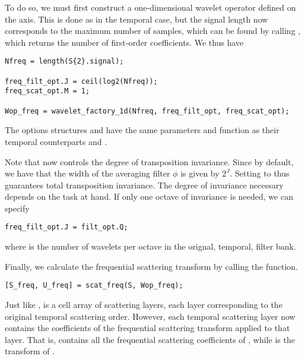 \documentclass{article}
\begin{document}
To do so, we must first construct a one-dimensional wavelet operator defined on the  axis. This is done as in the temporal case, but the signal length now corresponds to the maximum number of  samples, which can be found by calling , which returns the number of first-order coefficients. We thus have
\begin{lstlisting}
Nfreq = length(S{2}.signal);

freq_filt_opt.J = ceil(log2(Nfreq));
freq_scat_opt.M = 1;

Wop_freq = wavelet_factory_1d(Nfreq, freq_filt_opt, freq_scat_opt);
\end{lstlisting}
The options structures  and  have the same parameters and function as their temporal counterparts  and .

Note that  now controls the degree of transposition invariance. Since  by default, we have that the width of the averaging filter $\phi$ is given by $2^J$. Setting  to  thus guarantees total transposition invariance. The degree of invariance necessary depends on the task at hand. If only one octave of invariance is needed, we can specify
\begin{lstlisting}
freq_filt_opt.J = filt_opt.Q;
\end{lstlisting}
where  is the number of wavelets per octave in the orignal, temporal, filter bank.

Finally, we calculate the frequential scattering transform by calling the  function.
\begin{lstlisting}
[S_freq, U_freq] = scat_freq(S, Wop_freq);
\end{lstlisting}
Just like ,  is a cell array of scattering layers, each layer corresponding to the original temporal scattering order. However, each temporal scattering layer now contains the coefficients of the frequential scattering transform applied to that layer. That is,  contains all the frequential scattering coefficients of , while  is the transform of .
\end{document}
